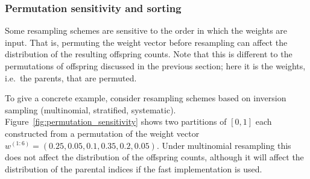 \subsubsection{Permutation sensitivity and sorting}
Some resampling schemes are sensitive to the order in which the weights are input.
That is, permuting the weight vector before resampling can affect the distribution of the resulting offspring counts.
Note that this is different to the permutations of offspring discussed in the previous section; here it is the weights, i.e.\ the parents, that are permuted.

To give a concrete example, consider resampling schemes based on inversion sampling (multinomial, stratified, systematic). Figure~\ref{fig:permutation_sensitivity} shows two partitions of $[0,1]$ each constructed from a permutation of the weight vector $w^{(1:6)} = (0.25,0.05,0.1,0.35,0.2,0.05)$.
Under multinomial resampling this does not affect the distribution of the offspring counts, although it will affect the distribution of the parental indices if the fast implementation is used.

